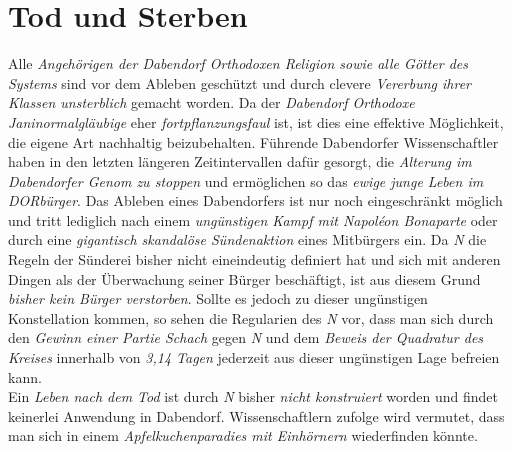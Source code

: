 \section{{Tod und Sterben}}\label{todsterben} 
Alle \textit{Angehörigen der Dabendorf Orthodoxen Religion sowie alle Götter des Systems} sind vor dem Ableben geschützt und durch clevere \textit{Vererbung ihrer Klassen unsterblich} gemacht worden. Da der \textit{Dabendorf Orthodoxe Janinormalgläubige} eher \textit{fortpflanzungsfaul} ist, ist dies eine effektive Möglichkeit, die eigene Art nachhaltig beizubehalten. Führende Dabendorfer Wissenschaftler haben in den letzten längeren Zeitintervallen dafür gesorgt, die \textit{Alterung im Dabendorfer Genom zu stoppen} und ermöglichen so das \textit{ewige junge Leben im DORbürger}. Das Ableben eines Dabendorfers ist nur noch eingeschränkt möglich und tritt lediglich nach einem \textit{ungünstigen Kampf mit Napoléon Bonaparte} oder durch eine \textit{gigantisch skandalöse Sündenaktion} eines Mitbürgers ein. Da \textit{N} die Regeln der Sünderei bisher nicht eineindeutig definiert hat und sich mit anderen Dingen als der Überwachung seiner Bürger beschäftigt, ist aus diesem Grund \textit{bisher kein Bürger verstorben}. Sollte es jedoch zu dieser ungünstigen Konstellation kommen, so sehen die Regularien des \textit{N} vor, dass man sich durch den \textit{Gewinn einer Partie Schach} gegen \textit{N} und dem \textit{Beweis der Quadratur des Kreises} innerhalb von \textit{3,14 Tagen} jederzeit aus dieser ungünstigen Lage befreien kann.\\
Ein \textit{Leben nach dem Tod} ist durch \textit{N} bisher \textit{nicht konstruiert} worden und findet keinerlei Anwendung in Dabendorf. Wissenschaftlern zufolge wird vermutet, dass man sich in einem \textit{Apfelkuchenparadies mit Einhörnern} wiederfinden könnte.
